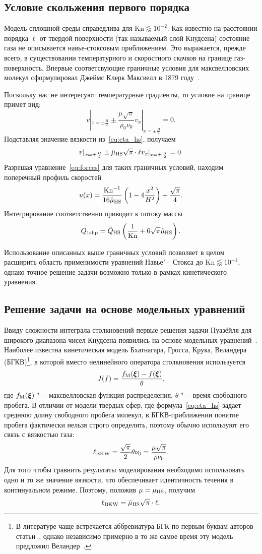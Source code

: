 \documentclass[english,russian,a4paper,12pt]{article}
\newcommand{\Kn}{\mathrm{Kn}}
\newcommand{\muHS}{\hat{\mu}_{\rm{HS}}}
\newcommand{\QHS}{\hat{Q}_{\rm{HS}}}
\begin{document}
\subsection{Условие скольжения первого порядка}

Модель сплошной среды справедлива для \(\Kn\lessapprox10^{-2}\).
Как известно на расстоянии порядка \(\ell\) от твердой поверхности (так называемый слой Кнудсена)
состояние газа не описывается навье-стоксовым приближением.
Это выражается, прежде всего, в существовании температурного и скоростного скачков на границе газ-поверхность.
Впервые соответсвующие граничные условия для максвелловских молекул сформулировал
Джеймс Клерк Максвелл в 1879 году~\cite{Maxwell1879}.

Поскольку нас не интересуют температурные градиенты, то условие на границе примет вид:
\[ v|_{x=\pm\frac{H}{2}} \pm \frac{\mu\sqrt{\pi}}{\rho_0\nu_0}v_x|_{x=\pm\frac{H}{2}} = 0. \]
Подставляя значение вязкости из~\eqref{eq:eta_hs}, получаем
\[ v|_{x=\pm\frac{H}{2}} \pm \muHS\sqrt{\pi}\cdot\ell v_x|_{x=\pm\frac{H}{2}} = 0. \]
Разрешая уравнение~\eqref{eq:forces} для таких граничных условий, находим поперечный профиль скоростей
\[ u(x) = \frac{\Kn^{-1}}{16\muHS} \left(1-4\frac{x^2}{H^2}\right) + \frac{\sqrt{\pi}}{4}. \]
Интегрирование соответственно приводит к потоку массы
\[ Q_{1\text{slip}} = \QHS\left(\frac1{\Kn} + 6\sqrt{\pi}\muHS \right). \]

Использование описанных выше граничных условий позволяет в целом расширить область применимости
уравнений Навье"--~Стокса до \(\Kn\lessapprox10^{-1}\), однако точное решение задачи возможно
только в рамках кинетического уравнения.

\subsection{Решение задачи на основе модельных уравнений}

Ввиду сложности интеграла столкновений первые решения задачи Пуазёйля для широкого диапазона чисел Кнудсена
появились на основе модельных уравнений~\cite{Cercignani1963}.
Наиболее известна кинетическая модель Бхатнагара, Гросса, Крука, Веландера (БГКВ)\footnote
{
	В литературе чаще встречается аббревиатура БГК по первым буквам авторов статьи~\cite{Bhatnagar1954},
	однако независимо примерно в то же самое время эту модель предложил Веландер~\cite{Welander1954}.
},
в которой вместо нелинейного оператора столкновения используется
\[ J(f) = \frac{f_{\rm{M}}(\boldsymbol\xi) - f(\boldsymbol\xi)}{\theta}, \]
где \(f_{\rm{M}}(\boldsymbol\xi)\) "--- максвелловская функция распределения, \(\theta\) "--- время свободного пробега.
В отличии от модели твердых сфер, где формула~\eqref{eq:eta_hs} задает среднюю длину свободного пробега молекул,
в БГКВ-приближении понятие пробега фактически нельзя строго определить,
поэтому обычно используют его связь с вязкостью газа:
\[ \ell_{\rm{BKW}} = \frac{\sqrt{\pi}}{2}\theta\nu_0 = \frac{\mu\sqrt{\pi}}{\rho\nu_0}. \]
Для того чтобы сравнить результаты моделирования необходимо использовать одно и то же значение вязкости,
что обеспечивает идентичность течения в континуальном режиме.
Поэтому, положив \(\mu = \mu_{\rm{HS}}\), получим
\[ \ell_{\rm{BKW}} = \muHS\sqrt{\pi}\cdot\ell. \]
\end{document}
